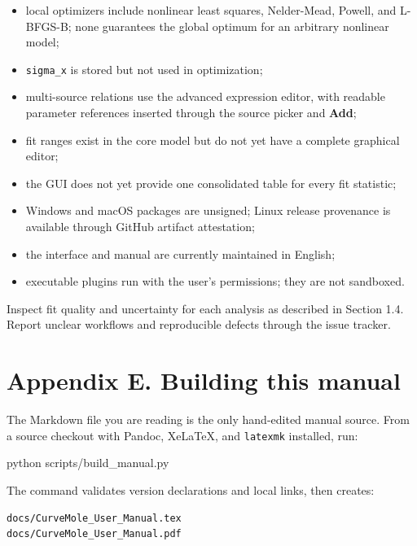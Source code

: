 \documentclass[
  10pt,
  a4paper,
  oneside]{scrreprt}
\newenvironment{Shaded}{}{}
\newcommand{\ExtensionTok}[1]{#1}
\newcommand{\NormalTok}[1]{#1}
\providecommand{\tightlist}{%
  \setlength{\itemsep}{0pt}\setlength{\parskip}{0pt}}
\begin{document}
\begin{itemize}
\tightlist
\item
  local optimizers include nonlinear least squares, Nelder-Mead, Powell,
  and L-BFGS-B; none guarantees the global optimum for an arbitrary
  nonlinear model;
\item
  \texttt{sigma\_x} is stored but not used in optimization;
\item
  multi-source relations use the advanced expression editor, with
  readable parameter references inserted through the source picker and
  \textbf{Add};
\item
  fit ranges exist in the core model but do not yet have a complete
  graphical editor;
\item
  the GUI does not yet provide one consolidated table for every fit
  statistic;
\item
  Windows and macOS packages are unsigned; Linux release provenance is
  available through GitHub artifact attestation;
\item
  the interface and manual are currently maintained in English;
\item
  executable plugins run with the user's permissions; they are not
  sandboxed.
\end{itemize}

Inspect fit quality and uncertainty for each analysis as described in
Section 1.4. Report unclear workflows and reproducible defects through
the issue tracker.

\hypertarget{appendix-e.-building-this-manual}{%
\chapter{Appendix E. Building this
manual}\label{appendix-e.-building-this-manual}}

The Markdown file you are reading is the only hand-edited manual source.
From a source checkout with Pandoc, XeLaTeX, and \texttt{latexmk}
installed, run:

\begin{Shaded}
\begin{Highlighting}[]
\ExtensionTok{python}\NormalTok{ scripts/build\_manual.py}
\end{Highlighting}
\end{Shaded}

The command validates version declarations and local links, then
creates:

\begin{verbatim}
docs/CurveMole_User_Manual.tex
docs/CurveMole_User_Manual.pdf
\end{verbatim}
\end{document}
